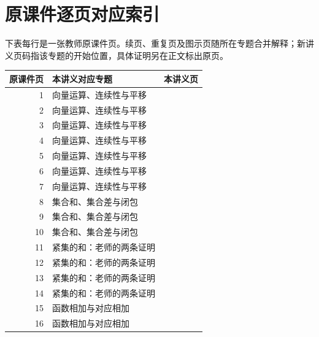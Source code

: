 \documentclass[11pt,a4paper]{article}
\theoremstyle{definition}\newtheorem{definition}{定义}\newtheorem{example}{例}
\begin{document}
\clearpage\section{原课件逐页对应索引}

下表每行是一张教师原课件页。续页、重复页及图示页随所在专题合并解释；新讲义页码指该专题的开始位置，具体证明另在正文标出原页。

\begin{longtable}{r p{.66\linewidth} r}\toprule 原课件页&本讲义对应专题&本讲义页\\\midrule\endhead

1 & 向量运算、连续性与平移 & \pageref{g:109:1}\\

2 & 向量运算、连续性与平移 & \pageref{g:109:1}\\

3 & 向量运算、连续性与平移 & \pageref{g:109:1}\\

4 & 向量运算、连续性与平移 & \pageref{g:109:1}\\

5 & 向量运算、连续性与平移 & \pageref{g:109:1}\\

6 & 向量运算、连续性与平移 & \pageref{g:109:1}\\

7 & 向量运算、连续性与平移 & \pageref{g:109:1}\\

8 & 集合和、集合差与闭包 & \pageref{g:109:8}\\

9 & 集合和、集合差与闭包 & \pageref{g:109:8}\\

10 & 集合和、集合差与闭包 & \pageref{g:109:8}\\

11 & 紧集的和：老师的两条证明 & \pageref{g:109:11}\\

12 & 紧集的和：老师的两条证明 & \pageref{g:109:11}\\

13 & 紧集的和：老师的两条证明 & \pageref{g:109:11}\\

14 & 紧集的和：老师的两条证明 & \pageref{g:109:11}\\

15 & 函数相加与对应相加 & \pageref{g:109:15}\\

16 & 函数相加与对应相加 & \pageref{g:109:15}\\


\end{longtable}
\end{document}
